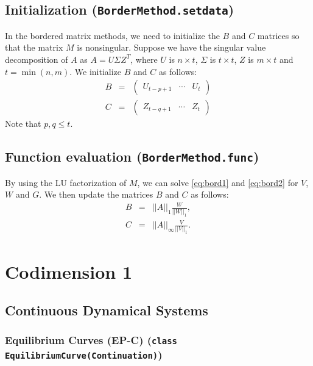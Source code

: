 \documentclass{article}[12pt]
\begin{document}
\subsection{Initialization (\texttt{BorderMethod.setdata})}

In the bordered matrix methods, we need to initialize the $B$ and $C$ matrices so that the matrix $M$ is nonsingular.  Suppose we have the singular value decomposition of $A$ as $A = U\Sigma Z^{T}$, where $U$ is $n\times t$, $\Sigma$ is $t\times t$, $Z$ is $m\times t$ and $t = \min(n,m)$.  We initialize $B$ and $C$ as follows:
\begin{eqnarray*}
B & = & \left(\begin{array}{ccc} U_{t-p+1} & \cdots & U_{t} \end{array}\right) \\
C & = & \left(\begin{array}{ccc} Z_{t-q+1} & \cdots & Z_{t} \end{array}\right)
\end{eqnarray*}
Note that $p, q \leq t$.

\subsection{Function evaluation (\texttt{BorderMethod.func})}

By using the LU factorization of $M$, we can solve \eqref{eq:bord1} and \eqref{eq:bord2} for $V$, $W$ and $G$.  We then update the matrices $B$ and $C$ as follows:
\begin{eqnarray*}
B & = & ||A||_{1}\frac{W}{||W||_{1}}, \\
C & = & ||A||_{\infty}\frac{V}{||V||_{1}}.
\end{eqnarray*}

\section{Codimension 1}

\subsection{Continuous Dynamical Systems}

\subsubsection{Equilibrium Curves (EP-C) (\texttt{class EquilibriumCurve(Continuation)})}

\end{document}
